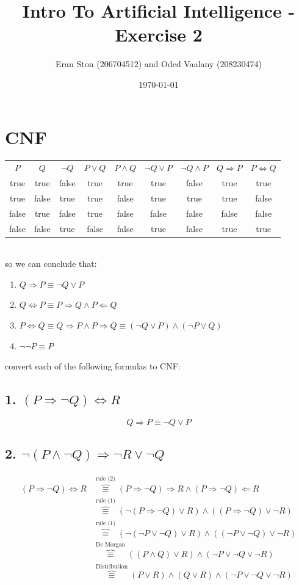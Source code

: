 \documentclass{article}
\title{Intro To Artificial Intelligence - Exercise 2}
\author{Eran Ston (206704512) and Oded Vaalany (208230474)}
\date{\today}
\begin{document}
\maketitle

\section{CNF}
\begin{tabular}{ccccccccc}
    $P$ & $Q$  & $\neg Q$ & $P \lor Q$ & $P \land Q$ & $\neg Q \lor P$ & $\neg Q \land P$ & $Q \Rightarrow P$ & $P \iff Q$\\
    true&true&false&true&true&true&false&true&true\\
    true&false&true&true&false&true&true&true&false\\
    false&true&false&true&false&false&false&false&false\\
    false&false&true&false&false&true&false&true&true\\
\end{tabular}\\
so we can conclude that:
\begin{enumerate}
    \item $Q \Rightarrow P \equiv \neg Q \lor P$
    \item $Q \iff P \equiv P \Rightarrow Q \land P \Leftarrow Q $
    \item $P \iff Q \equiv Q \Rightarrow P \land P \Rightarrow Q  \equiv (\neg Q \lor P) \land (\neg P \lor Q)$
    \item $\neg \neg P \equiv P$
\end{enumerate}
convert each of the following formulas to CNF:
\subsection{1. $(P \Rightarrow \neg Q) \iff R$}
\begin{equation}
    Q \Rightarrow P \equiv \neg Q \lor P
\end{equation}
\subsection{2. $\neg (P \land \neg Q) \Rightarrow \neg R \lor \neg Q$}
\begin{equation}
    \begin{aligned}
        (P \Rightarrow \neg Q) \iff R &\overbrace{\equiv}^{\text{rule (2)}} (P \Rightarrow \neg Q) \Rightarrow R \land (P \Rightarrow \neg Q) \Leftarrow R\\
        &\overbrace{\equiv}^{\text{rule (1)}} (\neg (P \Rightarrow \neg Q) \lor R ) \land (( P \Rightarrow \neg Q) \lor \neg R)\\
        &\overbrace{\equiv}^{\text{rule (1)}} (\neg (\neg P \lor \neg Q) \lor R ) \land ((\neg P \lor \neg Q) \lor \neg R)\\
        &\overbrace{\equiv}^{\text{De Morgan}} ((  P \land  Q) \lor R) \land (\neg P \lor \neg Q \lor \neg R)\\
        &\overbrace{\equiv}^{\text{Distribution}} ( P \lor R) \land (  Q \lor R) \land  (\neg P \lor \neg Q \lor \neg R)
    \end{aligned}
\end{equation}
\end{document}
